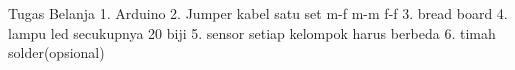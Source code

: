 Tugas Belanja
1. Arduino
2. Jumper kabel satu set m-f m-m f-f 
3. bread board
4. lampu led secukupnya 20 biji
5. sensor setiap kelompok harus berbeda
6. timah solder(opsional)
